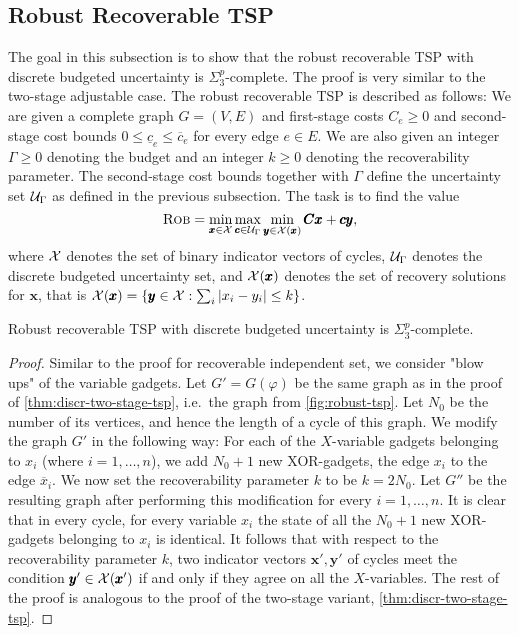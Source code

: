 \subsection{Robust Recoverable TSP}
\label{subsec:rec-tsp}

The goal in this subsection is to show that the robust recoverable TSP with discrete budgeted uncertainty is $\Sigma_3^p$-complete. 
The proof is very similar to the two-stage adjustable case. 
The robust recoverable TSP is described as follows: 
We are given a complete graph $G = (V,E)$ and first-stage costs $C_e \geq 0$ and second-stage cost bounds $0 \leq \underline{c}_e \leq \overline{c}_e$ for every edge $e \in E$. 
We are also given an integer $\Gamma \geq 0$ denoting the budget and an integer $k \geq 0$ denoting the recoverability parameter. 
The second-stage cost bounds together with $\Gamma$ define the uncertainty set $\mathcal{U}_\Gamma$ as defined in the previous subsection.
The task is to find the value 
\begin{equation}
 \textsc{Rob} = \min_{\pmb x  \in \mathcal{X}} \max_{\pmb c \in \mathcal{U}_\Gamma } \min_{\pmb y \in \mathcal{X}(\pmb x) } \pmb C \pmb x + \pmb c \pmb y, \label{eq:recoverable-tsp}
 \end{equation}
where $\mathcal{X}$ denotes the set of binary indicator vectors of  cycles, $\mathcal{U}_\Gamma$ denotes the discrete budgeted uncertainty set, and $\mathcal{X}(\pmb x)$ denotes the set of recovery solutions for $\pmb x$, that is $\mathcal{X}(\pmb x) = \{ \pmb y \in \mathcal{X} : \sum_i |x_i - y_i| \leq k \}$.


\begin{theorem}
\label{thm:recoverable-tsp}
Robust recoverable TSP with discrete budgeted uncertainty is $\Sigma_3^p$-complete.
\end{theorem}

\begin{proof}
Similar to the proof for recoverable independent set, we consider "blow ups" of the variable gadgets. 
Let $G' = G(\varphi)$ be the same graph as in the proof of \cref{thm:discr-two-stage-tsp}, i.e.\ the graph from \cref{fig:robust-tsp}. 
Let $N_0$ be the number of its vertices, and hence the length of a  cycle of this graph. We modify the graph $G'$ in the following way:
For each of the $X$-variable gadgets belonging to $x_i$ (where $i = 1,\dots,n$), we add $N_0 + 1$ new XOR-gadgets,  the edge $x_i$ to the edge $\overline x_i$.
We now set the recoverability parameter $k$ to be $k = 2N_0$. Let $G''$ be the resulting graph after performing this modification for every $i=1,\dots,n$.  
It is clear that in every  cycle, for every variable $x_i$ the state of all the $N_0 + 1$ new XOR-gadgets belonging to $x_i$ is identical.
It follows that with respect to the recoverability parameter $k$, two indicator vectors $\pmb x', \pmb y'$ of  cycles meet the condition $\pmb y' \in \mathcal{X}(\pmb x')$ if and only if they agree on all the $X$-variables.
The rest of the proof is analogous to the proof of the two-stage variant,  \cref{thm:discr-two-stage-tsp}.
\end{proof}

